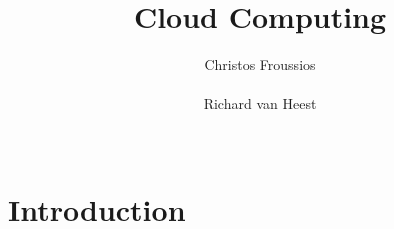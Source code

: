 \documentclass{stylesheet}
\begin{document}
\title{Cloud Computing}

\author{
\alignauthor
Christos Froussios\\
       \\
\alignauthor
Richard van Heest\\
       \\
}

\maketitle

\begin{abstract}

\end{abstract}

\section{Introduction}



\end{document}
